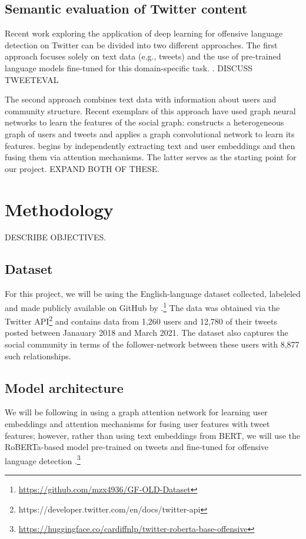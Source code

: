 \documentclass[letterpaper]{article} %
\begin{document}
\subsection{Semantic evaluation of Twitter content}
Recent work exploring the application of deep learning for offensive language detection on Twitter can be divided into two different approaches. The first approach focuses solely on text data (e.g., tweets) and the use of pre-trained language models fine-tuned for this domain-specific task. \citep{liu2019-nuli}. DISCUSS TWEETEVAL


The second approach combines text data with information about users and community structure. Recent exemplars of this approach have used graph neural networks to learn the features of the social graph: \citet{Mishra2019} constructs a heterogeneous graph of users and tweets and applies a graph convolutional network to learn its features. \citet{Miao2022} begins by independently extracting text and user embeddings and then fusing them via attention mechanisms. The latter serves as the starting point for our project. EXPAND BOTH OF THESE.


\section{Methodology}

DESCRIBE OBJECTIVES.

\subsection{Dataset}

For this project, we will be using the English-language dataset collected, labeleled and made publicly available on GitHub by \citet{Miao2022}.\footnote{\url{https://github.com/mzx4936/GF-OLD-Dataset}} The data was obtained via the Twitter API\footnote{https://developer.twitter.com/en/docs/twitter-api} and contains data from 1,260 users and 12,780 of their tweets posted between Janauary 2018 and March 2021. The dataset also captures the social community in terms of the follower-network between these users with 8,877 such relationships.  

\subsection{Model architecture}

We will be following \citet{Miao2022} in using a graph attention network for learning user embeddings and attention mechanisms for fusing user features with tweet features; however, rather than using text embeddings from BERT, we will use the RoBERTa-based model pre-trained on tweets and fine-tuned for offensive language detection \citep{Barbieri2020}.\footnote{\url{https://huggingface.co/cardiffnlp/twitter-roberta-base-offensive}}
\end{document}

